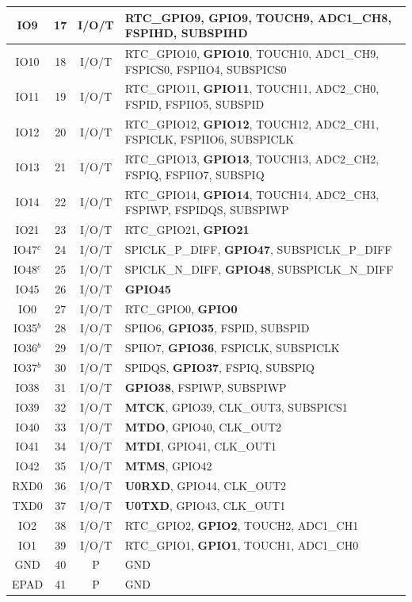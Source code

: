\begin{longtable}[H]{|c|c|c|p{7cm}|}
	\hline
	IO9 & 17 & I/O/T & RTC\_GPIO9, \textbf{GPIO9}, TOUCH9, ADC1\_CH8, FSPIHD, SUBSPIHD \\
	\hline
	IO10 & 18 & I/O/T & RTC\_GPIO10, \textbf{GPIO10}, TOUCH10, ADC1\_CH9, FSPICS0, FSPIIO4, SUBSPICS0 \\
	\hline
	IO11 & 19 & I/O/T & RTC\_GPIO11, \textbf{GPIO11}, TOUCH11, ADC2\_CH0, FSPID, FSPIIO5, SUBSPID \\
	\hline
	IO12 & 20 & I/O/T & RTC\_GPIO12, \textbf{GPIO12}, TOUCH12, ADC2\_CH1, FSPICLK, FSPIIO6, SUBSPICLK \\
	\hline
	IO13 & 21 & I/O/T & RTC\_GPIO13, \textbf{GPIO13}, TOUCH13, ADC2\_CH2, FSPIQ, FSPIIO7, SUBSPIQ \\
	\hline
	IO14 & 22 & I/O/T & RTC\_GPIO14, \textbf{GPIO14}, TOUCH14, ADC2\_CH3, FSPIWP, FSPIDQS, SUBSPIWP \\
	\hline
	IO21 & 23 & I/O/T & RTC\_GPIO21, \textbf{GPIO21} \\
	\hline
	IO47$^c$ & 24 & I/O/T & SPICLK\_P\_DIFF, \textbf{GPIO47}, SUBSPICLK\_P\_DIFF \\
	\hline
	IO48$^c$ & 25 & I/O/T & SPICLK\_N\_DIFF, \textbf{GPIO48}, SUBSPICLK\_N\_DIFF \\
	\hline
	IO45 & 26 & I/O/T & \textbf{GPIO45} \\
	\hline
	IO0 & 27 & I/O/T & RTC\_GPIO0, \textbf{GPIO0} \\
	\hline
	IO35$^b$ & 28 & I/O/T & SPIIO6, \textbf{GPIO35}, FSPID, SUBSPID \\
	\hline
	IO36$^b$ & 29 & I/O/T & SPIIO7, \textbf{GPIO36}, FSPICLK, SUBSPICLK \\
	\hline
	IO37$^b$ & 30 & I/O/T & SPIDQS, \textbf{GPIO37}, FSPIQ, SUBSPIQ \\
	\hline
	IO38 & 31 & I/O/T & \textbf{GPIO38}, FSPIWP, SUBSPIWP \\
	\hline
	IO39 & 32 & I/O/T & \textbf{MTCK}, GPIO39, CLK\_OUT3, SUBSPICS1 \\
	\hline
	IO40 & 33 & I/O/T & \textbf{MTDO}, GPIO40, CLK\_OUT2 \\
	\hline
	IO41 & 34 & I/O/T & \textbf{MTDI}, GPIO41, CLK\_OUT1 \\
	\hline
	IO42 & 35 & I/O/T & \textbf{MTMS}, GPIO42 \\
	\hline
	RXD0 & 36 & I/O/T & \textbf{U0RXD}, GPIO44, CLK\_OUT2 \\
	\hline
	TXD0 & 37 & I/O/T & \textbf{U0TXD}, GPIO43, CLK\_OUT1 \\
	\hline
	IO2 & 38 & I/O/T & RTC\_GPIO2, \textbf{GPIO2}, TOUCH2, ADC1\_CH1 \\
	\hline
	IO1 & 39 & I/O/T & RTC\_GPIO1, \textbf{GPIO1}, TOUCH1, ADC1\_CH0 \\
	\hline
	GND & 40 & P & GND \\
	\hline
	EPAD & 41 & P & GND \\
	\hline
\end{longtable}

